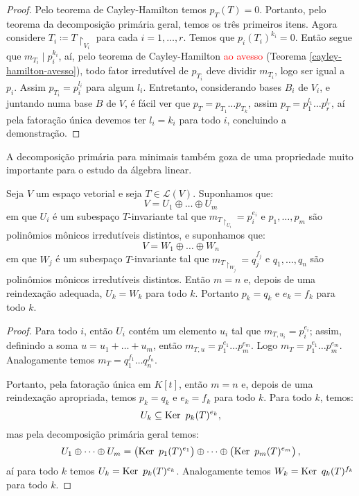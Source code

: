\documentclass[11pt,twoside,a4paper]{book}
\begin{document}
\begin{proof}
Pelo teorema de Cayley-Hamilton temos \(p_T(T)=0\). Portanto, pelo teorema da decomposição primária geral, temos os três primeiros itens. Agora considere \(T_i\coloneqq T\upharpoonright_{V_i}\)
para cada \(i=1,\dots,r\).
Temos que \(p_i(T_i)^{k_i}=0\). Então segue que \(m_{T_i}\mid
p_i^{k_i}\), aí, pelo teorema de Cayley-Hamilton \textcolor{red}{ao avesso} (Teorema \ref{cayley-hamilton-avesso}), todo fator irredutível de $p_{T_i}$ deve dividir $m_{T_i}$, logo ser igual a $p_i$. Assim $p_{T_i}=p_i^{l_i}$ para algum $l_i$. Entretanto, considerando bases $B_i$ de $V_i$, e juntando numa base $B$ de $V$, é fácil ver que $p_T=p_{T_1}\dots p_{T_k}$, assim $p_T=p_1^{l_1}\ldots p_r^{l_r}$, aí pela fatoração única devemos ter $l_i=k_i$ para todo $i$, concluindo a demonstração.
\end{proof}

\noindent
A decomposição primária para minimais também goza de uma propriedade muito importante para o estudo da álgebra linear.

\begin{teorema}
Seja $V$ um espaço vetorial e seja $T\in\mathcal{L}(V)$. Suponhamos que:
\[
V=U_1\oplus\dots\oplus U_m
\]
em que $U_i$ é um subespaço $T$-invariante tal que $m_{T\upharpoonright_{U_i}}=p_i^{e_i}$ e $p_1,\dots,p_m$ são polinômios mônicos irredutíveis distintos, e suponhamos que:
\[
V=W_1\oplus\dots\oplus W_n
\]
em que $W_j$ é um subespaço $T$-invariante tal que $m_{T\upharpoonright_{W_j}}=q_j^{f_j}$ e $q_1,\dots,q_n$ são polinômios mônicos irredutíveis distintos. Então $m=n$ e, depois de uma reindexação adequada, $U_k=W_k$ para todo $k$. Portanto $p_k=q_k$ e $e_k=f_k$ para todo $k$.
\end{teorema}
\begin{proof}
Para todo $i$, então $U_i$ contém um elemento $u_i$ tal que $m_{T,u_i}=p_i^{e_i}$; assim, definindo a soma $u=u_1+\dots+u_m$, então $m_{T,u}=p_1^{e_1}\dots p_m^{e_m}$. Logo $m_T=p_1^{e_1}\dots p_m^{e_m}$. Analogamente temos $m_T=q_1^{f_1}\dots q_n^{f_n}$.

\medskip
\noindent
Portanto, pela fatoração única em $K[t]$, então $m=n$ e, depois de uma reindexação apropriada, temos $p_k=q_k$ e $e_k=f_k$ para todo $k$. Para todo $k$, temos:
\[
U_k\subseteq\Ker \ p_k(T)^{e_k},
\]
mas pela decomposição primária geral temos:
\[
U_1\oplus\dots\oplus U_m=\left(\Ker \ p_1(T)^{e_1}\right)\oplus\dots\oplus\left(\Ker \ p_m(T)^{e_m}\right),
\]
aí para todo $k$ temos $U_k=\operatorname{Ker} \ p_k(T)^{e_k}$. Analogamente temos $W_k=\Ker \ q_k(T)^{f_k}$ para todo $k$.
\end{proof}
\end{document}
